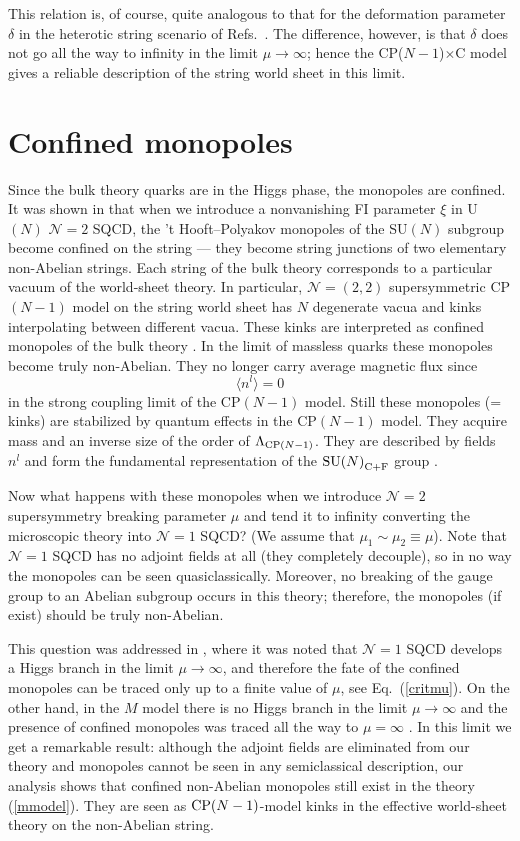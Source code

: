 \documentclass[12pt]{article}
\def\beq{\begin{equation}}
\def\eeq{\end{equation}}
\newcommand{\ntwo}{${\mathcal N}=2$ }
\newcommand{\ntwot}{${\mathcal N}= \left(2,2\right) $ }
\newcommand{\none}{${\mathcal N}=1$ }
\def\cfl {$\text{SU($N$)}_{\rm C+F}$ }
\newcommand{\CPC}{CP($N-1$)$\times$C }
\begin{document}
This relation is, of course, quite analogous to that for the deformation parameter $ \delta $ 
in the heterotic string scenario of Refs.~\cite{SYhet,BSYhet}. 
The difference, however, is that $ \delta $ does not go  all the way to infinity
in the limit $\mu\to\infty$; hence  the \CPC model 
gives a reliable description of the string world sheet in this limit. 




\section{Confined monopoles}
\setcounter{equation}{0}

Since the bulk theory quarks are in the Higgs phase, the monopoles are confined. It was shown in
\cite{Tong,SYmon,HT2} that when we introduce a nonvanishing FI parameter $\xi$  
in U$(N)$ \ntwo SQCD, the   't Hooft--Polyakov monopoles of 
the SU$(N)$ subgroup become confined on the string --- 
they become string junctions of two elementary non-Abelian strings. Each string of the bulk theory corresponds to a particular vacuum of the world-sheet theory. In particular, \ntwot supersymmetric CP$(N-1)$ model on the string world sheet
has $N$ degenerate vacua and kinks interpolating between different vacua. These kinks are interpreted as 
confined monopoles of the bulk theory \cite{Tong,SYmon,HT2}. In the limit of massless quarks
these monopoles become truly non-Abelian. They no longer carry average magnetic flux since
\beq
\langle n^l\rangle =0
\eeq
in the strong coupling limit of the CP$(N-1)$ model. Still these monopoles (= kinks) are stabilized by  quantum effects in the CP$(N-1)$ model. 
They acquire mass and an inverse size of the  order of $\Lambda_{{\rm CP}(N-1)}$. They 
are described by fields $n^l$ and form the fundamental representation of the \cfl group \cite{W79}.

Now what happens with these monopoles when we introduce \ntwo supersymmetry breaking parameter
$\mu$ and tend it to infinity converting the microscopic theory  into \none SQCD? 
(We assume that $\mu_1\sim\mu_2\equiv\mu$).
Note that \none SQCD has no adjoint fields at all (they completely decouple), so in no
way the monopoles can be seen quasiclassically. 
Moreover, no breaking of the gauge group to an Abelian subgroup occurs in this theory;
therefore, the monopoles (if exist) should be truly non-Abelian.

This question was addressed in \cite{SYhet}, where it was noted that \none SQCD  develops 
a Higgs branch in the  limit $\mu\to\infty$, 
and therefore the fate of the confined monopoles can be traced only up to a
 finite value of $\mu$, see Eq.~(\ref{critmu}). On the other hand, in the $M$ model
there is no Higgs branch in the limit $\mu\to\infty$ and the presence of confined monopoles was traced all the way to
 $\mu = \infty$ \cite{GSYmmodel}.
In this limit we get a remarkable result: although the adjoint fields 
are eliminated from our theory 
and  monopoles cannot be seen in any semiclassical description,
our  analysis shows
that confined non-Abelian monopoles still exist in the theory (\ref{mmodel}). They are seen
as ${\rm CP}(N-1)$-model kinks in the effective world-sheet theory on the non-Abelian string.
\end{document}
